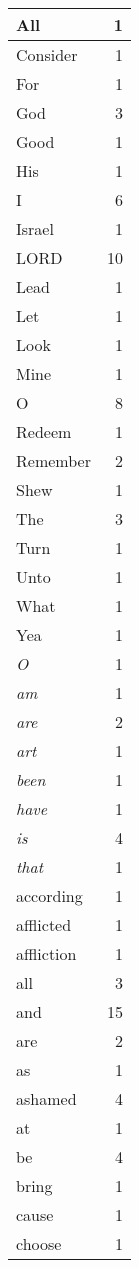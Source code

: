 \begin{center}
\begin{longtable}{l|r}
\hline \hline
\endlastfoot
All & 1 \\ \hline
Consider & 1 \\ \hline
For & 1 \\ \hline
God & 3 \\ \hline
Good & 1 \\ \hline
His & 1 \\ \hline
I & 6 \\ \hline
Israel & 1 \\ \hline
LORD & 10 \\ \hline
Lead & 1 \\ \hline
Let & 1 \\ \hline
Look & 1 \\ \hline
Mine & 1 \\ \hline
O & 8 \\ \hline
Redeem & 1 \\ \hline
Remember & 2 \\ \hline
Shew & 1 \\ \hline
The & 3 \\ \hline
Turn & 1 \\ \hline
Unto & 1 \\ \hline
What & 1 \\ \hline
Yea & 1 \\ \hline
\emph{O} & 1 \\ \hline
\emph{am} & 1 \\ \hline
\emph{are} & 2 \\ \hline
\emph{art} & 1 \\ \hline
\emph{been} & 1 \\ \hline
\emph{have} & 1 \\ \hline
\emph{is} & 4 \\ \hline
\emph{that} & 1 \\ \hline
according & 1 \\ \hline
afflicted & 1 \\ \hline
affliction & 1 \\ \hline
all & 3 \\ \hline
and & 15 \\ \hline
are & 2 \\ \hline
as & 1 \\ \hline
ashamed & 4 \\ \hline
at & 1 \\ \hline
be & 4 \\ \hline
bring & 1 \\ \hline
cause & 1 \\ \hline
choose & 1 \\ \hline

\end{longtable}
\end{center}
